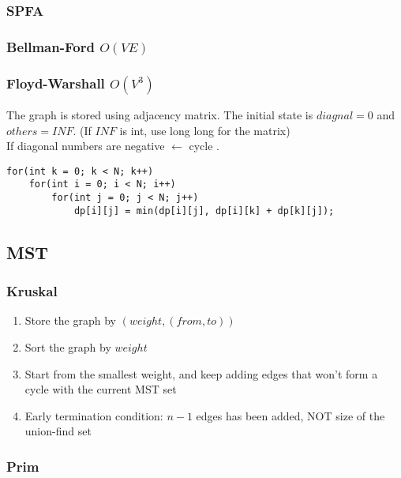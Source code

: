 \documentclass[10pt,oneside]{article}
\begin{document}
\begin{landscape}
\begin{multicols}{2}
\subsubsection{SPFA}

\subsubsection{Bellman-Ford $O(VE)$}

\subsubsection{Floyd-Warshall $O(V^3)$}

The graph is stored using adjacency matrix. The initial state is $diagnal = 0$ and $others = INF$. (If $INF$ is int, use long long for the matrix)\\
If diagonal numbers are negative $\leftarrow$ cycle . \\

\begin{lstlisting}
for(int k = 0; k < N; k++)
	for(int i = 0; i < N; i++)
		for(int j = 0; j < N; j++)
			dp[i][j] = min(dp[i][j], dp[i][k] + dp[k][j]);
\end{lstlisting}

\subsection{MST}

\subsubsection{Kruskal}

\begin{enumerate}
	\item Store the graph by $(weight, (from , to))$
	\item Sort the graph by $weight$ 
	\item Start from the smallest weight, and keep adding edges that won't form a cycle with the current MST set
	\item Early termination condition: $n - 1$ edges has been added, NOT size of the union-find set
\end{enumerate}

\subsubsection{Prim}


\end{multicols}
\end{landscape}
\end{document}
